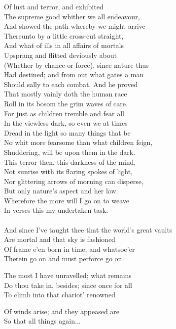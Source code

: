 Of lust and terror, and exhibited\\
The supreme good whither we all endeavour,\\
And showed the path whereby we might arrive\\
Thereunto by a little cross-cut straight,\\
And what of ills in all affairs of mortals\\
Upsprang and flitted deviously about\\
(Whether by chance or force), since nature thus\\
Had destined; and from out what gates a man\\
Should sally to each combat. And he proved\\
That mostly vainly doth the human race\\
Roll in its bosom the grim waves of care.\\
For just as children tremble and fear all\\
In the viewless dark, so even we at times\\
Dread in the light so many things that be\\
No whit more fearsome than what children feign,\\
Shuddering, will be upon them in the dark.\\
This terror then, this darkness of the mind,\\
Not sunrise with its flaring spokes of light,\\
Nor glittering arrows of morning can disperse,\\
But only nature's aspect and her law.\\
Wherefore the more will I go on to weave\\
In verses this my undertaken task.\\
\\
And since I've taught thee that the world's great vaults\\
Are mortal and that sky is fashioned\\
Of frame e'en born in time, and whatsoe'er\\
Therein go on and must perforce go on

The most I have unravelled; what remains\\
Do thou take in, besides; since once for all\\
To climb into that chariot' renowned

Of winds arise; and they appeased are\\
So that all things again...

